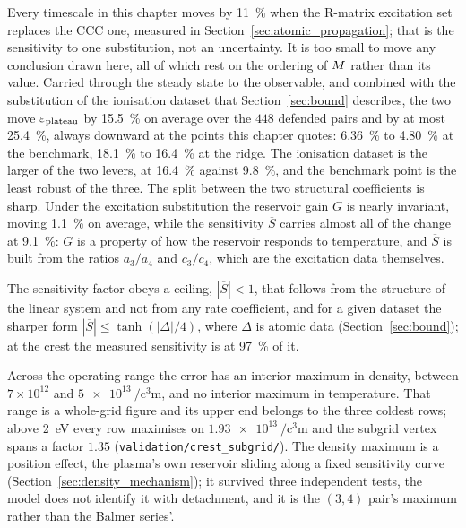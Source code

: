 Every timescale in this chapter moves by \SI{11}{\percent} when the R-matrix
excitation set replaces the CCC one, measured in
Section~\ref{sec:atomic_propagation}; that is the sensitivity to one
substitution, not an uncertainty. It is too small to move any
conclusion drawn here, all of which rest on the ordering of $M$ rather than
its value. Carried through the steady state to the observable, and
combined with the substitution of the ionisation dataset that
Section~\ref{sec:bound} describes, the two move $\varepsilon_{\mathrm{plateau}}$ by
\SI{15.5}{\percent} on average over the $448$ defended pairs and by at most
\SI{25.4}{\percent}, always downward at the points this chapter quotes:
\SI{6.36}{\percent} to \SI{4.80}{\percent} at the benchmark,
\SI{18.1}{\percent} to \SI{16.4}{\percent} at the ridge. The ionisation
dataset is the larger of the two levers, at \SI{16.4}{\percent} against
\SI{9.8}{\percent}, and the benchmark point is the least robust of the three.
The split between the two structural coefficients is sharp. Under the
excitation substitution the reservoir gain $G$ is nearly invariant, moving
\SI{1.1}{\percent} on average, while the sensitivity $\overline{S}$ carries
almost all of the change at \SI{9.1}{\percent}: $G$ is a
property of how the reservoir responds to temperature, and $\overline{S}$ is
built from the ratios $a_3/a_4$ and $c_3/c_4$, which are the excitation data
themselves.

The sensitivity factor obeys a ceiling, $|\overline{S}| < 1$, that follows from
the structure of the linear system and not from any rate coefficient, and for
a given dataset the sharper form $|\overline{S}| \le \tanh(|\Delta|/4)$, where
$\Delta$ is atomic data (Section~\ref{sec:bound}); at the crest the measured sensitivity is
at \SI{97}{\percent} of it.

Across the operating range the error has an interior maximum in density,
between $7\times10^{12}$ and $\SI{5e13}{\per\cubic\centi\metre}$, and no
interior maximum in temperature. That range is a whole-grid figure and its
upper end belongs to the three coldest rows; above \SI{2}{\electronvolt} every
row maximises on $\SI{1.93e13}{\per\cubic\centi\metre}$ and the subgrid vertex
spans a factor $1.35$ (\texttt{validation/crest\_subgrid/}). The density
maximum is a position effect, the plasma's own reservoir sliding along a fixed
sensitivity curve (Section~\ref{sec:density_mechanism}); it survived three
independent tests, the model does not identify it with detachment, and it is
the $(3,4)$ pair's maximum rather than the Balmer series'.

